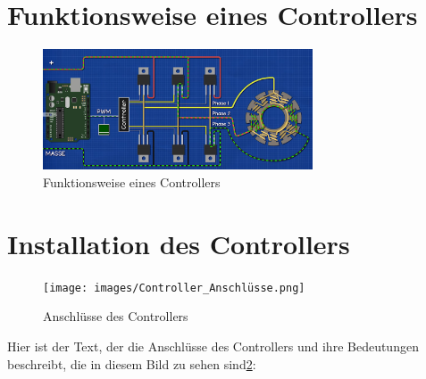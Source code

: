 \section{Funktionsweise eines Controllers}






\begin{figure}[h]
  \centering
  \includegraphics[width=8cm]{images/Funktion der Mosfets.png}
  \caption{Funktionsweise eines Controllers \cite{noauthor_2822_nodate}}%
  \label{fig:18}
\end{figure}

\section{Installation des Controllers}

\begin{figure}[h]
  \centering
  \texttt{[image: images/Controller\_Anschlüsse.png]}
  \caption{Anschlüsse des Controllers\cite{noauthor_2248_nodate}}%
  \label{fig:16}
\end{figure}


Hier ist der Text, der die Anschlüsse des Controllers und ihre Bedeutungen beschreibt, die in diesem Bild zu sehen sind\ref{fig:16}:

